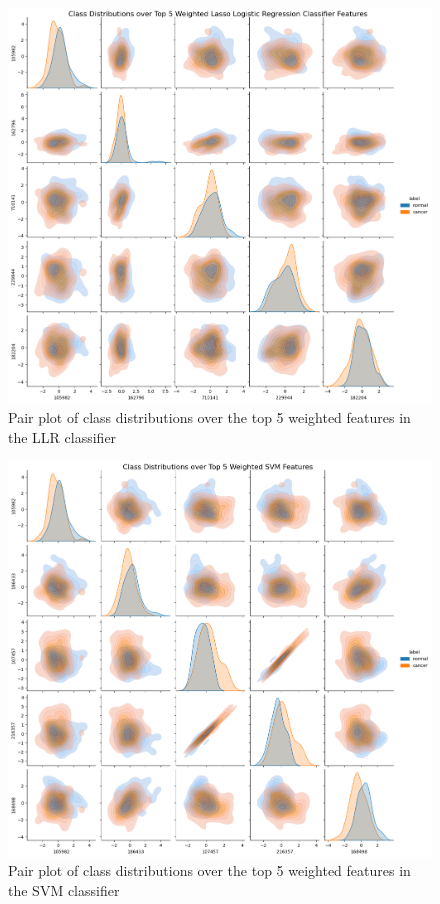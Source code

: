 \documentclass[twocolumn]{article}
\begin{document}
\begin{figure}[H]
    \centering
    \includegraphics[width=0.85\linewidth]{figures/PairPlot_Lasso.png}
    \caption{Pair plot of class distributions over the top 5 weighted features in the LLR classifier}
    \label{fig:pp-lasso}
\end{figure}

\begin{figure}[H]
    \centering
    \includegraphics[width=0.85\linewidth]{figures/PairPlot_SVM.png}
    \caption{Pair plot of class distributions over the top 5 weighted features in the SVM classifier}
    \label{fig:pp-svm}
\end{figure}
\end{document}
